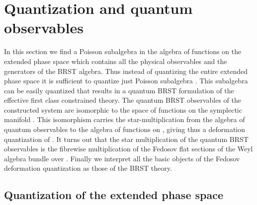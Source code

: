\documentclass[a4paper,11pt,oneside]{amsart}
\theoremstyle{plain}
\numberwithin{equation}{section} %
\numberwithin{figure}{section} %
\def\manM{{\mathcal M}}
\def\aA{{ \mathfrak A}}
\begin{document}
\section{Quantization and quantum observables}
In this section we find a Poisson subalgebra \myHighlight{$\aA$}\coordHE{} in the algebra
of functions on the extended phase space which contains
all the physical observables and the generators of the
BRST algebra.  Thus instead of quantizing the entire
extended phase space it is sufficient to quantize
just Poisson subalgebra \myHighlight{$\aA$}\coordHE{}.  This subalgebra can
be easily quantized that results in a quantum BRST
formulation of the effective first class constrained
theory.  The quantum BRST observables of the constructed
system are isomorphic to the space of functions on
the symplectic manifold \myHighlight{$\manM$}\coordHE{}.  This isomorphism
carries the star-multiplication from the algebra of
quantum observables to the algebra of functions
on \myHighlight{$\manM$}\coordHE{}, giving thus a deformation quantization
of \myHighlight{$\manM$}\coordHE{}.  It turns out that the star multiplication
of the quantum BRST observables is the fibrewise
multiplication of the Fedosov flat sections of the
Weyl algebra bundle over \myHighlight{$\manM$}\coordHE{}. Finally we interpret
all the basic objects of the Fedosov deformation quantization
as those of the BRST theory.

\subsection{Quantization of the extended phase space}
\end{document}
